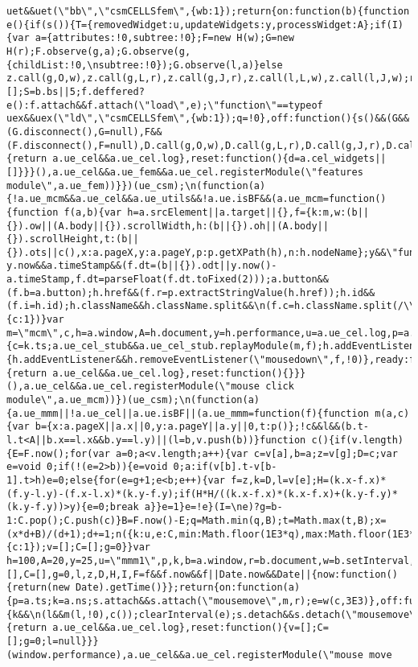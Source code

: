 \documentclass[
]{article}
\begin{document}
\begin{verbatim}
uet&&uet(\"bb\",\"csmCELLSfem\",{wb:1});return{on:function(b){function e(){if(s()){T={removedWidget:u,updateWidgets:y,processWidget:A};if(I){var a={attributes:!0,subtree:!0};F=new H(w);G=new H(r);F.observe(g,a);G.observe(g,{childList:!0,\nsubtree:!0});G.observe(l,a)}else z.call(g,O,w),z.call(g,L,r),z.call(g,J,r),z.call(l,L,w),z.call(l,J,w);r()}}g=c.body;l=c.head;z=g.addEventListener;D=g.removeEventListener;t=b.ts;d=a.cel_widgets||[];S=b.bs||5;f.deffered?e():f.attach&&f.attach(\"load\",e);\"function\"==typeof uex&&uex(\"ld\",\"csmCELLSfem\",{wb:1});q=!0},off:function(){s()&&(G&&(G.disconnect(),G=null),F&&(F.disconnect(),F=null),D.call(g,O,w),D.call(g,L,r),D.call(g,J,r),D.call(l,L,w),D.call(l,J,w));f.count&&f.count(\"cel.widgets.batchesProcessed\",\nU);q=!1},ready:function(){return a.ue_cel&&a.ue_cel.log},reset:function(){d=a.cel_widgets||[]}}}(),a.ue_cel&&a.ue_fem&&a.ue_cel.registerModule(\"features module\",a.ue_fem))}})(ue_csm);\n(function(a){!a.ue_mcm&&a.ue_cel&&a.ue_utils&&!a.ue.isBF&&(a.ue_mcm=function(){function f(a,b){var h=a.srcElement||a.target||{},f={k:m,w:(b||{}).ow||(A.body||{}).scrollWidth,h:(b||{}).oh||(A.body||{}).scrollHeight,t:(b||{}).ots||c(),x:a.pageX,y:a.pageY,p:p.getXPath(h),n:h.nodeName};y&&\"function\"===typeof y.now&&a.timeStamp&&(f.dt=(b||{}).odt||y.now()-a.timeStamp,f.dt=parseFloat(f.dt.toFixed(2)));a.button&&(f.b=a.button);h.href&&(f.r=p.extractStringValue(h.href));h.id&&(f.i=h.id);h.className&&h.className.split&&\n(f.c=h.className.split(/\\s+/));u(f,{c:1})}var m=\"mcm\",c,h=a.window,A=h.document,y=h.performance,u=a.ue_cel.log,p=a.ue_utils;return{on:function(k){c=k.ts;a.ue_cel_stub&&a.ue_cel_stub.replayModule(m,f);h.addEventListener&&h.addEventListener(\"mousedown\",f,!0)},off:function(a){h.addEventListener&&h.removeEventListener(\"mousedown\",f,!0)},ready:function(){return a.ue_cel&&a.ue_cel.log},reset:function(){}}}(),a.ue_cel&&a.ue_cel.registerModule(\"mouse click module\",a.ue_mcm))})(ue_csm);\n(function(a){a.ue_mmm||!a.ue_cel||a.ue.isBF||(a.ue_mmm=function(f){function m(a,c){var b={x:a.pageX||a.x||0,y:a.pageY||a.y||0,t:p()};!c&&l&&(b.t-l.t<A||b.x==l.x&&b.y==l.y)||(l=b,v.push(b))}function c(){if(v.length){E=F.now();for(var a=0;a<v.length;a++){var c=v[a],b=a;z=v[g];D=c;var e=void 0;if(!(e=2>b)){e=void 0;a:if(v[b].t-v[b-1].t>h)e=0;else{for(e=g+1;e<b;e++){var f=z,k=D,l=v[e];H=(k.x-f.x)*(f.y-l.y)-(f.x-l.x)*(k.y-f.y);if(H*H/((k.x-f.x)*(k.x-f.x)+(k.y-f.y)*(k.y-f.y))>y){e=0;break a}}e=1}e=!e}(I=\ne)?g=b-1:C.pop();C.push(c)}B=F.now()-E;q=Math.min(q,B);t=Math.max(t,B);x=(x*d+B)/(d+1);d+=1;n({k:u,e:C,min:Math.floor(1E3*q),max:Math.floor(1E3*t),avg:Math.floor(1E3*x)},{c:1});v=[];C=[];g=0}}var h=100,A=20,y=25,u=\"mmm1\",p,k,b=a.window,r=b.document,w=b.setInterval,s=a.ue,n=a.ue_cel.log,e,q=1E3,t=0,x=0,d=0,E,B,v=[],C=[],g=0,l,z,D,H,I,F=f&&f.now&&f||Date.now&&Date||{now:function(){return(new Date).getTime()}};return{on:function(a){p=a.ts;k=a.ns;s.attach&&s.attach(\"mousemove\",m,r);e=w(c,3E3)},off:function(a){k&&\n(l&&m(l,!0),c());clearInterval(e);s.detach&&s.detach(\"mousemove\",m,r)},ready:function(){return a.ue_cel&&a.ue_cel.log},reset:function(){v=[];C=[];g=0;l=null}}}(window.performance),a.ue_cel&&a.ue_cel.registerModule(\"mouse move 
\end{verbatim}
\end{document}

